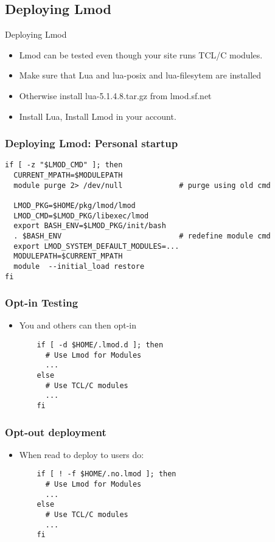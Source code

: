 \documentclass{beamer}
\begin{document}
\subsection{Deploying Lmod}
\label{sec:deploying_lmod}

\begin{frame}{Deploying Lmod}
  \begin{itemize}
    \item Lmod can be tested even though your site runs TCL/C modules.
    \item Make sure that Lua and lua-posix and lua-filesytem are installed
    \item Otherwise install lua-5.1.4.8.tar.gz from lmod.sf.net
    \item Install Lua, Install Lmod in your account.
  \end{itemize}
\end{frame}

\begin{frame}[fragile]
    \frametitle{Deploying Lmod: Personal startup}
    {\small
\begin{verbatim}
if [ -z "$LMOD_CMD" ]; then
  CURRENT_MPATH=$MODULEPATH
  module purge 2> /dev/null             # purge using old cmd

  LMOD_PKG=$HOME/pkg/lmod/lmod
  LMOD_CMD=$LMOD_PKG/libexec/lmod
  export BASH_ENV=$LMOD_PKG/init/bash
  . $BASH_ENV                           # redefine module cmd
  export LMOD_SYSTEM_DEFAULT_MODULES=...
  MODULEPATH=$CURRENT_MPATH
  module  --initial_load restore
fi
\end{verbatim}
}
\end{frame}

\begin{frame}[fragile]
    \frametitle{Opt-in Testing}
  \begin{itemize}
    \item You and others can then opt-in
    {\small
\begin{verbatim}
    if [ -d $HOME/.lmod.d ]; then
      # Use Lmod for Modules
      ...
    else
      # Use TCL/C modules
      ...
    fi
\end{verbatim}
}
  \end{itemize}
\end{frame}

\begin{frame}[fragile]
    \frametitle{Opt-out deployment}
  \begin{itemize}
    \item When read to deploy to users do:
    {\small
\begin{verbatim}
    if [ ! -f $HOME/.no.lmod ]; then
      # Use Lmod for Modules
      ...
    else
      # Use TCL/C modules
      ...
    fi

\end{verbatim}
}
  \end{itemize}
\end{frame}
\end{document}
